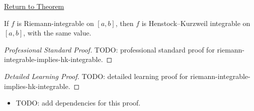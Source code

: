 \newpage
{}
\label{prf:riemann-integrable-implies-hk-integrable}
\begin{remark*}[Return]\hyperref[thm:riemann-integrable-implies-hk-integrable]{Return to Theorem}\end{remark*}

\begin{theorem*}
If \(f\) is Riemann-integrable on \([a,b]\), then \(f\) is
Henstock--Kurzweil integrable on \([a,b]\), with the same value.
\end{theorem*}

\begin{proof}[Professional Standard Proof]
\LRAProofBodyStart
TODO: professional standard proof for riemann-integrable-implies-hk-integrable.
\end{proof}

\begin{proof}[Detailed Learning Proof]
\LRAProofBodyStart
TODO: detailed learning proof for riemann-integrable-implies-hk-integrable.
\end{proof}

\begin{remark*}
\end{remark*}

\begin{dependencies}
\begin{itemize}
  \item TODO: add dependencies for this proof.
\end{itemize}
\end{dependencies}

\clearpage
